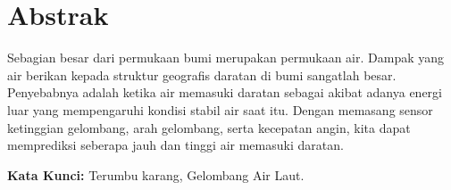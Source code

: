 \chapter*{Abstrak}
Sebagian besar dari permukaan bumi merupakan permukaan air. Dampak yang air berikan kepada struktur geografis daratan di bumi sangatlah besar. Penyebabnya adalah ketika air memasuki daratan sebagai akibat adanya energi luar yang mempengaruhi kondisi stabil air saat itu. Dengan memasang sensor ketinggian gelombang, arah gelombang, serta kecepatan angin, kita dapat memprediksi seberapa jauh dan tinggi air memasuki daratan. 
\vspace{0.5 cm}
\begin{flushleft}
{\textbf{Kata Kunci:} Terumbu karang, Gelombang Air Laut.}
\end{flushleft}